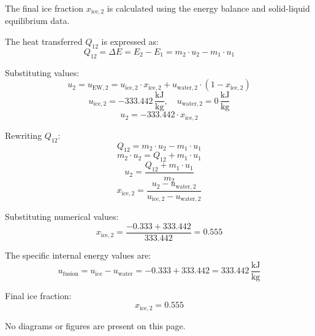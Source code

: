 The final ice fraction \( x_{\text{ice},2} \) is calculated using the energy balance and solid-liquid equilibrium data.  

The heat transferred \( Q_{12} \) is expressed as:  
\[
Q_{12} = \Delta E = E_2 - E_1 = m_2 \cdot u_2 - m_1 \cdot u_1
\]  

Substituting values:  
\[
u_2 = u_{\text{EW},2} = u_{\text{ice},2} \cdot x_{\text{ice},2} + u_{\text{water},2} \cdot (1 - x_{\text{ice},2})
\]  
\[
u_{\text{ice},2} = -333.442 \, \frac{\text{kJ}}{\text{kg}}, \quad u_{\text{water},2} = 0 \, \frac{\text{kJ}}{\text{kg}}
\]  
\[
u_2 = -333.442 \cdot x_{\text{ice},2}
\]  

Rewriting \( Q_{12} \):  
\[
Q_{12} = m_2 \cdot u_2 - m_1 \cdot u_1
\]  
\[
m_2 \cdot u_2 = Q_{12} + m_1 \cdot u_1
\]  
\[
u_2 = \frac{Q_{12} + m_1 \cdot u_1}{m_2}
\]  
\[
x_{\text{ice},2} = \frac{u_2 - u_{\text{water},2}}{u_{\text{ice},2} - u_{\text{water},2}}
\]  

Substituting numerical values:  
\[
x_{\text{ice},2} = \frac{-0.333 + 333.442}{333.442} = 0.555
\]  

The specific internal energy values are:  
\[
u_{\text{fusion}} = u_{\text{ice}} - u_{\text{water}} = -0.333 + 333.442 = 333.442 \, \frac{\text{kJ}}{\text{kg}}
\]  

Final ice fraction:  
\[
x_{\text{ice},2} = 0.555
\]  

No diagrams or figures are present on this page.
